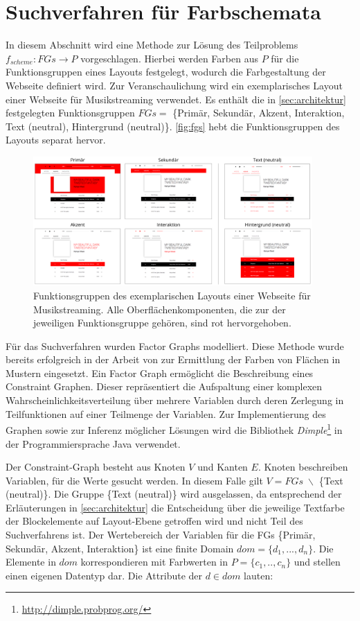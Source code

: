 \section{Suchverfahren für Farbschemata}
\label{sec:farbschema}

In diesem Abschnitt wird eine Methode zur Lösung des Teilproblems $f_{scheme}: FGs \to P$ vorgeschlagen. Hierbei werden Farben aus $P$ für die Funktionsgruppen eines Layouts festgelegt, wodurch die Farbgestaltung der Webseite definiert wird. Zur Veranschaulichung wird ein exemplarisches Layout einer Webseite für Musikstreaming verwendet. Es enthält die in \autoref{sec:architektur} festgelegten Funktionsgruppen $FGs = $ \{Primär, Sekundär, Akzent, Interaktion, Text (neutral), Hintergrund (neutral)\}. \autoref{fig:fgs} hebt die Funktionsgruppen des Layouts separat hervor.

\begin{figure}[h]
\centering
\includegraphics[width=0.95\textwidth]{img/fgs.png}
\caption{Funktionsgruppen des exemplarischen Layouts einer  Webseite für Musikstreaming. Alle Oberflächenkomponenten, die zur der jeweiligen Funktionsgruppe gehören, sind rot hervorgehoben.}
\label{fig:fgs}
\end{figure}

Für das Suchverfahren wurden Factor Graphs modelliert. Diese Methode wurde bereits erfolgreich in der Arbeit von \citet{magazines} zur Ermittlung der Farben von Flächen in Mustern eingesetzt. Ein Factor Graph ermöglicht die Beschreibung eines Constraint Graphen. Dieser repräsentiert die Aufspaltung einer komplexen Wahrscheinlichkeitsverteilung über mehrere Variablen durch deren Zerlegung in Teilfunktionen auf einer Teilmenge der Variablen. Zur Implementierung des Graphen sowie zur Inferenz möglicher Lösungen wird die Bibliothek \emph{Dimple}\footnote{\url{http://dimple.probprog.org/}} in der Programmiersprache Java verwendet.

Der Constraint-Graph besteht aus Knoten $V$ und Kanten $E$. Knoten beschreiben Variablen, für die Werte gesucht werden. In diesem Falle gilt $V = FGs\; \backslash$ \{Text (neutral)\}. Die Gruppe \{Text (neutral)\} wird ausgelassen, da entsprechend der Erläuterungen in \autoref{sec:architektur} die Entscheidung über die jeweilige Textfarbe der Blockelemente auf Layout-Ebene  getroffen wird und nicht Teil des Suchverfahrens ist. Der Wertebereich der Variablen für die FGs \{Primär, Sekundär, Akzent, Interaktion\} ist eine finite Domain $dom = \{d_1, ..., d_{n}\}$. Die Elemente in $dom$ korrespondieren mit Farbwerten in $P = \{c_1, .., c_n\}$ und stellen einen eigenen Datentyp dar. Die Attribute der $d \in dom$ lauten:

